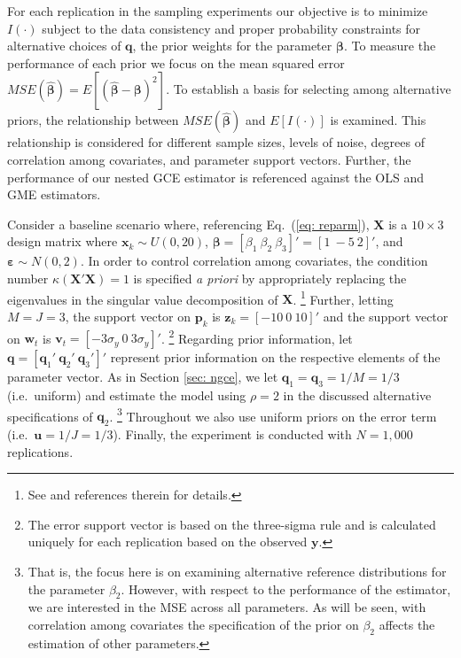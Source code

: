 \documentclass[english]{article}
\begin{document}
For each replication in the sampling experiments our objective is to minimize 
$I(\cdot)$ subject to the data consistency and proper probability constraints 
for alternative choices of $\mathbf{q}$, the prior weights for the parameter 
$\mathbf{\beta}$. 
To measure the performance of each prior we focus on the mean squared 
error $MSE(\hat{\mathbf{\beta}}) = E[(\hat{\mathbf{\beta}}- 
\mathbf{\beta})^2]$.
To establish a basis for selecting among alternative priors, the relationship 
between $MSE(\hat{\mathbf{\beta}})$ and $E[I(\cdot)]$ is examined.
This relationship is considered for different sample sizes, levels of noise, 
degrees of correlation among covariates, and parameter support vectors.
Further, the performance of our nested GCE estimator is referenced 
against the OLS and GME estimators.

Consider a baseline scenario where, referencing Eq.\ (\ref{eq: reparm}),
$\mathbf{X}$ is a $10 \times 3$ design matrix where $\mathbf{x}_k \sim 
U(0,20)$, $\mathbf{\beta}= [\beta_1 ~ \beta_2 ~ \beta_3]'=[1 ~ -5 ~ 2]'$, 
and $\mathbf{\varepsilon} \sim N(0,2)$.
In order to control correlation among covariates, the condition
number $\kappa(\mathbf{X}'\mathbf{X})=1$ is specified \textit{a priori}
by appropriately replacing the eigenvalues in the singular value 
decomposition of $\mathbf{X}$.%
\footnote{See \citet[pg.\ 133]{golan1996} and references therein for 
details.}
Further, letting $M=J=3$, the support vector on $\mathbf{p}_k$ is 
$\mathbf{z}_k = [- 10 ~ 0 ~ 10]'$ and the support vector on $\mathbf{w}_t$ 
is $\mathbf{v}_t = [- 3\sigma_y ~ 0 ~ 3\sigma_y]'$.%
\footnote{The error support vector is based on the three-sigma
rule \citep{pukelsheim1994} and is calculated 
uniquely for each replication based on the observed $\mathbf{y}$.}
Regarding prior information, let $\mathbf{q} = [\mathbf{q}_1' ~ 
\mathbf{q}_2' ~ \mathbf{q}_3']'$ represent prior information on the 
respective elements of the parameter vector.
As in Section \ref{sec: ngce}, we let $\mathbf{q}_1 = \mathbf{q}_3 = 1/M 
= 1/3$ (i.e.\ uniform) and estimate the model using $\rho=2$  in the 
discussed alternative specifications of $\mathbf{q}_2$.%
\footnote{That is, the focus here is on examining alternative reference 
distributions for the parameter $\beta_2$. 
However, with respect to the performance of the estimator, we are 
interested in the MSE across all parameters.
As will be seen, with correlation among covariates the specification of the 
prior on $\beta_2$ affects the estimation of other parameters.}
Throughout we also use uniform priors on the error term 
(i.e.\ $\mathbf{u} = 1/J = 1/3$).
Finally, the experiment is conducted with $N=1,000$ replications.
\end{document}
